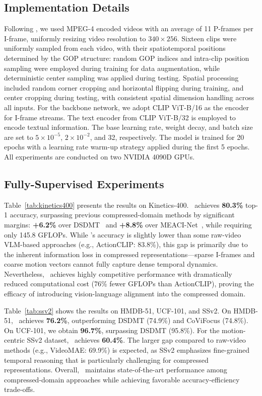 \documentclass[runningheads]{llncs}
\begin{document}
\subsection{Implementation Details}

Following \cite{wu2018compressed}, we used MPEG-4 encoded videos with an average of 11 P-frames per I-frame, uniformly resizing video resolution to $340 \times 256$. Sixteen clips were uniformly sampled from each video, with their spatiotemporal positions determined by the GOP structure: random GOP indices and intra-clip position sampling were employed during training for data augmentation, while deterministic center sampling was applied during testing. Spatial processing included random corner cropping and horizontal flipping during training, and center cropping during testing, with consistent spatial dimension handling across all inputs. For the backbone network, we adopt CLIP ViT-B/16 as the encoder for I-frame streams. The text encoder from CLIP ViT-B/32 is employed to encode textual information. The base learning rate, weight decay, and batch size are set to $5\times 10^{-5}$, $2\times 10^{-2}$, and 32, respectively. The model is trained for 20 epochs with a learning rate warm-up strategy applied during the first 5 epochs. All experiments are conducted on two NVIDIA 4090D GPUs.



\subsection{Fully-Supervised Experiments}
Table~\ref{tab:kinetics400} presents the results on Kinetics-400. \methodname~achieves \textbf{80.3\%} top-1 accuracy, surpassing previous compressed-domain methods by significant margins: \textbf{+6.2\%} over DSDMT~\cite{DSDMT} and \textbf{+8.8\%} over MEACI-Net~\cite{li2022representation}, while requiring only 145.8 GFLOPs. While \methodname's accuracy is slightly lower than some raw-video VLM-based approaches (e.g., ActionCLIP: 83.8\%), this gap is primarily due to the inherent information loss in compressed representations—sparse I-frames and coarse motion vectors cannot fully capture dense temporal dynamics. Nevertheless, \methodname~achieves highly competitive performance with dramatically reduced computational cost (76\% fewer GFLOPs than ActionCLIP), proving the efficacy of introducing vision-language alignment into the compressed domain.

Table~\ref{tab:ssv2} shows the results on HMDB-51, UCF-101, and SSv2. On HMDB-51, \methodname~achieves \textbf{76.2\%}, outperforming DSDMT (74.9\%) and CoViFocus (74.8\%). On UCF-101, we obtain \textbf{96.7\%}, surpassing DSDMT (95.8\%). For the motion-centric SSv2 dataset, \methodname~achieves \textbf{60.4\%}. The larger gap compared to raw-video methods (e.g., VideoMAE: 69.9\%) is expected, as SSv2 emphasizes fine-grained temporal reasoning that is particularly challenging for compressed representations. Overall, \methodname~maintains state-of-the-art performance among compressed-domain approaches while achieving favorable accuracy-efficiency trade-offs.
\end{document}
